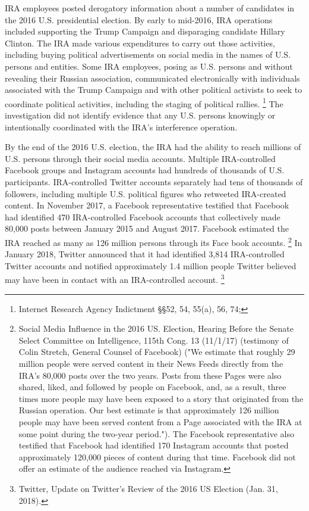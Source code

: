 IRA employees posted derogatory information about a  number of candidates in the 2016 U.S. presidential election.
By early to mid-2016, IRA operations included supporting the Trump Campaign and disparaging candidate Hillary Clinton.
The IRA made various expenditures to carry out those activities, including buying political advertisements on social media in the names of U.S. persons and entities.
Some IRA employees, posing as U.S. persons and without revealing their Russian association, communicated electronically with individuals associated with the Trump Campaign and with other political activists to seek to coordinate political activities, including the staging of political rallies.%
\footnote{Internet Research Agency Indictment \S\S 52, 54, 55(a), 56, 74; }
The investigation did not identify evidence that any U.S. persons knowingly or intentionally coordinated with the IRA's interference operation.

By the end of the 2016 U.S. election, the IRA had the ability to reach millions of U.S. persons through their social media accounts.
Multiple IRA-controlled Facebook groups and Instagram accounts had hundreds of thousands of U.S. participants.
IRA-controlled Twitter accounts separately had tens of thousands of followers, including multiple U.S. political figures who retweeted IRA-created content.
In November 2017, a Facebook representative testified that Facebook had identified 470 IRA-controlled Facebook accounts that collectively made 80,000 posts between January 2015 and August 2017.
Facebook estimated the IRA reached as many as 126 million persons through its Face book accounts.%
\footnote{Social Media Influence in the 2016 US. Election, Hearing Before the Senate Select Committee on Intelligence, 115th Cong. 13 (11/1/17) (testimony of Colin Stretch, General Counsel of Facebook)
("We estimate that roughly 29 million people were served content in their News Feeds directly from the IRA's 80,000 posts over the two years.
Posts from these Pages were also shared, liked, and followed by people on Facebook, and, as a result, three times more people may have been exposed to a story that originated from the Russian operation.
Our best estimate is that approximately 126 million people may have been served content from a Page associated with the IRA at some point during the two-year period.").
The Facebook representative also testified that Facebook had identified 170 Instagram accounts that posted approximately 120,000 pieces of content during that time.
Facebook did not offer an estimate of the audience reached via Instagram.}
In January 2018, Twitter announced that it had identified 3,814 IRA-controlled Twitter accounts and notified approximately 1.4 million people Twitter believed may have been in contact with an IRA-controlled account.%
\footnote{Twitter, Update on Twitter's Review of the 2016 US Election (Jan. 31, 2018).}

